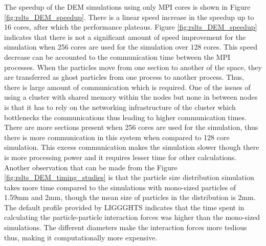 \documentclass[preprint,11pt,authoryear]{elsarticle}
\begin{document}
The speedup of the DEM simulations using only MPI cores is shown in Figure \ref{fig:rslts_DEM_speedup}.
There is a linear speed increase in the speedup up to 16 cores, after which the 
performance plateaus.
Figure \ref{fig:rslts_DEM_speedup} indicates that there 
is not a significant amount of speed improvement for the simulation when 256 cores are used for the 
simulation over 128 cores. This speed decrease can be accounted to the communication time between 
the MPI processes. When the particles move from one section to another of the space, they are 
transferred as ghost particles from one process to another process. Thus, there is large amount of 
communication which is required. One of the issues of using a cluster with shared memory within 
the nodes but none in between nodes is that it has to rely on the networking infrastructure 
of the cluster which bottlenecks the communications thus leading to higher communication times. 
There are more sections present when 256 cores are used for the 
simulation, thus there is more communication in this system when compared to 128 core simulation. 
This excess communication makes the simulation slower though there is more processing power and 
it requires lesser time for other calculations. Another observation that can be made from the Figure 
\ref{fig:rslts_DEM_timing_studies} is that the particle size distribution simulation takes more time 
compared to the simulations with mono-sized particles of 1.59mm and 2mm, though the mean size of 
particles in the distribution is 2mm. The default profile provided by LIGGGHTS indicates that the time 
spent in calculating the particle-particle interaction forces was higher than the mono-sized 
simulations. The different diameters make the interaction forces more tedious thus, making it 
computationally more expensive. 
\end{document}
